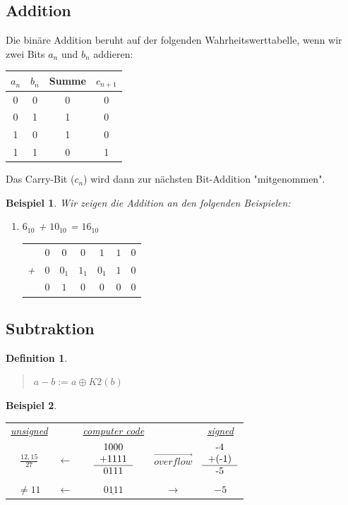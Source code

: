 \documentclass{report}
\newtheorem{mydef}{Definition}
\newtheorem{myexample}{Beispiel}
\begin{document}
\subsection{Addition}
Die binäre Addition beruht auf der folgenden Wahrheitswerttabelle, wenn wir zwei Bits $a_n$ und $b_n$ addieren:
\begin{center}\begin{tabular}{c c | c c}
$a_n$ & $b_n$ & Summe & $c_{n+1}$ \\ \hline
0 & 0 & 0 & 0 \\
0 & 1 & 1 & 0 \\
1 & 0 & 1 & 0 \\
1 & 1 & 0 & 1\end{tabular}\end{center}
Das Carry-Bit ($c_n$) wird dann zur nächsten Bit-Addition "mitgenommen". 
\begin{myexample}Wir zeigen die Addition an den folgenden Beispielen:
\begin{enumerate}
\item $6_{10}$ + $10_{10}$ = $16_{10}$\begin{center}\begin{tabular}{ccccccc}
& $0$ & $0$ & $0$ & $1$ & $1$ & $0$ \\
+ & $0$ & $0_1$ & $1_1$ & $0_1$ & $1$ & $0$ \\ \hline
& $0$ & $1$ & $0$ & $0$ & $0$ & $0$ \\ \hline \hline
\end{tabular}\end{center}
\end{enumerate}
\end{myexample}
\subsection{Subtraktion}
\begin{mydef}\begin{quote}$a - b := a \oplus K2(b)$\end{quote}\end{mydef}

\begin{myexample}\begin{tabular}{c c c c c}
\underline{unsigned} & & \underline{computer code} & & \underline{signed} \\
$\frac{12,15}{27}$ & $\leftarrow$ & $\begin{tabular}{c} 1000 \\ +1111 \\ \hline  0111  \\ \end{tabular} $ & $\overrightarrow{overflow}$ & $\begin{tabular}{c} -4 \\
+(-1) \\ \hline
-5 \\
\end{tabular} $ \\
$\not= 11$ & $\leftarrow$ & $\underline{0111} $ & $\rightarrow$ & $-5$ \\
\end{tabular}\end{myexample}
\end{document}
